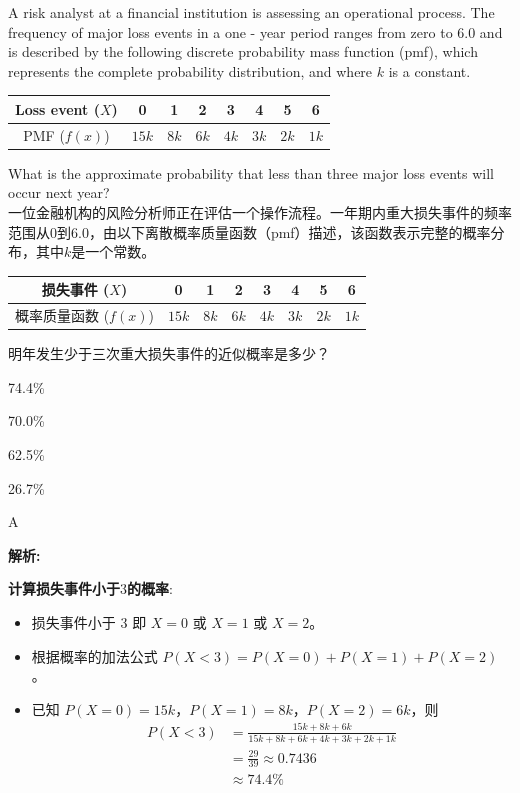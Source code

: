 \documentclass{article}
\newcounter{question} %
\newenvironment{explanation}
{\textbf{解析:}\par}
{\par}
\begin{document}
\begin{question}
A risk analyst at a financial institution is assessing an operational process. The frequency of major loss events in a one - year period ranges from zero to 6.0 and is described by the following discrete probability mass function (pmf), which represents the complete probability distribution, and where \(k\) is a constant.
\begin{center}
\begin{tabular}{|c|c|c|c|c|c|c|c|}
\hline
Loss event (\(X\)) & 0 & 1 & 2 & 3 & 4 & 5 & 6 \\
\hline
PMF (\(f(x)\)) & \(15k\) & \(8k\) & \(6k\) & \(4k\) & \(3k\) & \(2k\) & \(1k\) \\
\hline
\end{tabular}
\end{center}
What is the approximate probability that less than three major loss events will occur next year?\\
一位金融机构的风险分析师正在评估一个操作流程。一年期内重大损失事件的频率范围从0到6.0，由以下离散概率质量函数（pmf）描述，该函数表示完整的概率分布，其中\(k\)是一个常数。
\begin{center}
\begin{tabular}{|c|c|c|c|c|c|c|c|}
\hline
损失事件 (\(X\)) & 0 & 1 & 2 & 3 & 4 & 5 & 6 \\
\hline
概率质量函数 (\(f(x)\)) & \(15k\) & \(8k\) & \(6k\) & \(4k\) & \(3k\) & \(2k\) & \(1k\) \\
\hline
\end{tabular}
\end{center}
明年发生少于三次重大损失事件的近似概率是多少？\\
\end{question}

\begin{choices}
    \item 74.4\%
    \item 70.0\%
    \item 62.5\%
    \item 26.7\%
\end{choices}

\begin{correctanswer}
    A
\end{correctanswer}

\begin{explanation}
\textbf{计算损失事件小于\(3\)的概率}:
\begin{itemize}
    \item 损失事件小于 \(3\) 即 \(X = 0\) 或 \(X = 1\) 或 \(X = 2\)。
    \item 根据概率的加法公式 \(P(X < 3) = P(X = 0) + P(X = 1) + P(X = 2)\)。
    \item 已知 \(P(X = 0) = 15k\)，\(P(X = 1) = 8k\)，\(P(X = 2) = 6k\)，则
    \begin{align*}
        P(X < 3) &= \frac{15k + 8k + 6k}{15k + 8k + 6k + 4k + 3k + 2k + 1k} \\
                 &= \frac{29}{39} \approx 0.7436 \\
                 &\approx 74.4\%
        \end{align*}
\end{itemize}
\end{explanation}
\end{document}
